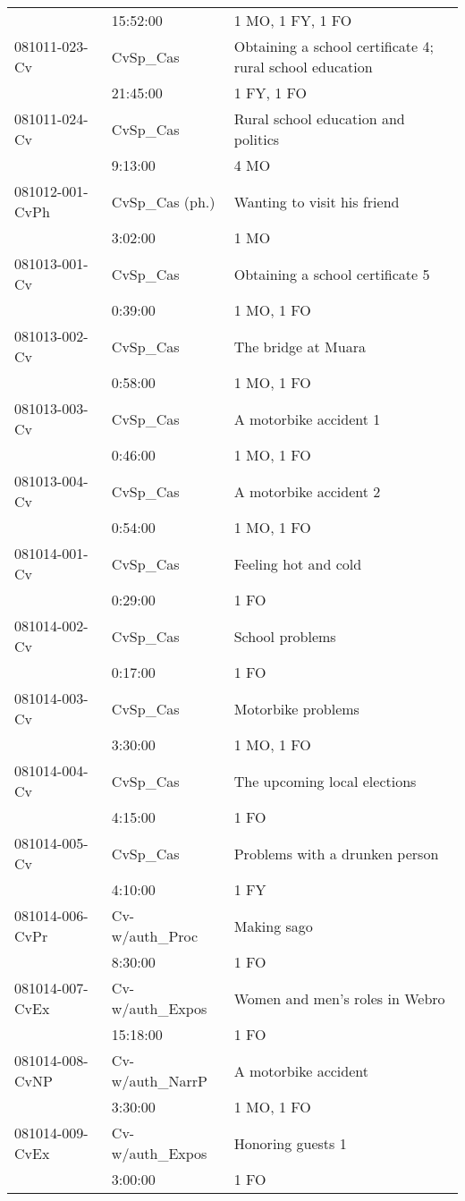 {\begin{longtable}{p{2.75cm}@{\hspace{1em}}p{2.75cm}@{\hspace{1em}}p{5.75cm}}
& 15:52:00 & 1 MO, 1 FY, 1 FO\\
081011-023-Cv & CvSp\_Cas & Obtaining a school certificate 4; rural school education\\
& 21:45:00 & 1 FY, 1 FO\\
081011-024-Cv & CvSp\_Cas & Rural school education and politics\\
& 9:13:00 & 4 MO\\
081012-001-CvPh & CvSp\_Cas (ph.) & Wanting to visit his friend\\
& 3:02:00 & 1 MO\\
081013-001-Cv & CvSp\_Cas & Obtaining a school certificate 5\\
& 0:39:00 & 1 MO, 1 FO\\
081013-002-Cv & CvSp\_Cas & The bridge at Muara\\
& 0:58:00 & 1 MO, 1 FO\\
081013-003-Cv & CvSp\_Cas & A motorbike accident 1\\
& 0:46:00 & 1 MO, 1 FO\\
081013-004-Cv & CvSp\_Cas & A motorbike accident 2\\
& 0:54:00 & 1 MO, 1 FO\\
081014-001-Cv & CvSp\_Cas & Feeling hot and cold\\
& 0:29:00 & 1 FO\\
081014-002-Cv & CvSp\_Cas & School problems\\
& 0:17:00 & 1 FO\\
081014-003-Cv & CvSp\_Cas & Motorbike problems\\
& 3:30:00 & 1 MO, 1 FO\\
081014-004-Cv & CvSp\_Cas & The upcoming local elections\\
& 4:15:00 & 1 FO\\
081014-005-Cv & CvSp\_Cas & Problems with a drunken person\\
& 4:10:00 & 1 FY\\
081014-006-CvPr & Cv-w/auth\_Proc & Making sago\\
& 8:30:00 & 1 FO\\
081014-007-CvEx & Cv-w/auth\_Expos & Women and men’s roles in Webro\\
& 15:18:00 & 1 FO\\
081014-008-CvNP & Cv-w/auth\_NarrP & A motorbike accident\\
& 3:30:00 & 1 MO, 1 FO\\
081014-009-CvEx & Cv-w/auth\_Expos & Honoring guests 1\\
& 3:00:00 & 1 FO\\

\end{longtable}}
